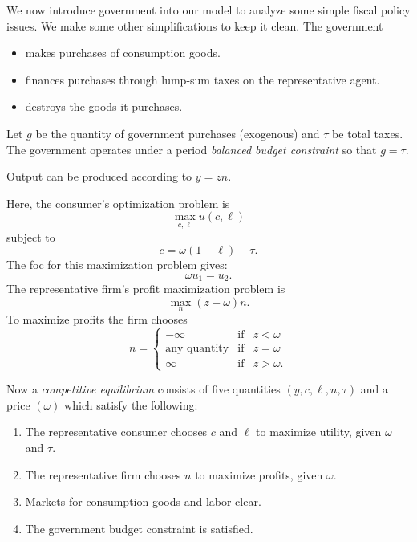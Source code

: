 \documentclass{sebase}
\begin{document}
We now introduce government into our model to analyze some simple fiscal
policy issues. We make some other simplifications to keep it clean. The
government

\begin{itemize}
\item makes purchases of consumption goods.

\item finances purchases through lump-sum taxes on the representative agent.

\item destroys the goods it purchases.
\end{itemize}

Let $g$ be the quantity of government purchases (exogenous) and $\tau $ be
total taxes. The government operates under a period \textit{balanced budget
constraint} so that $g=\tau .$

Output can be produced according to $y=zn$.

\pagebreak

Here, the consumer's optimization problem is%
\begin{equation*}
\underset{c,\ell }{\max }u\left( c,\ell \right)
\end{equation*}%
subject to%
\begin{equation*}
c=\omega (1-\ell )-\tau .
\end{equation*}%
The foc for this maximization problem gives:%
\begin{equation*}
\omega u_{1}=u_{2}.
\end{equation*}%
The representative firm's profit maximization problem is%
\begin{equation*}
\underset{n}{\max }\left( z-\omega \right) n.
\end{equation*}%
To maximize profits the firm chooses 
\begin{equation*}
n=\left\{ 
\begin{array}{ccc}
-\infty & \text{if} & z<\omega \\ 
\text{any quantity} & \text{if} & z=\omega \\ 
\infty & \text{if} & z>\omega .%
\end{array}%
\right.
\end{equation*}%
\pagebreak

Now a \textit{competitive equilibrium} consists of five quantities $\left(
y,c,\ell ,n,\tau \right) $ and a price $\left( \omega \right) $ which
satisfy the following:

\begin{enumerate}
\item The representative consumer chooses $c$ and $\ell $ to maximize
utility, given $\omega $ and $\tau $.

\item The representative firm chooses $n$ to maximize profits, given $\omega 
$.

\item Markets for consumption goods and labor clear.

\item The government budget constraint is satisfied.
\end{enumerate}
\end{document}
